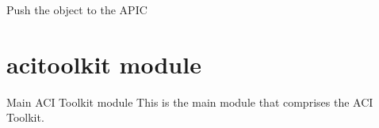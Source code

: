 \documentclass[letterpaper,10pt,english]{sphinxmanual}
\begin{document}
\begin{fulllineitems}
\begin{fulllineitems}
\begin{quote}
\begin{description}
\end{description}\end{quote}

\end{fulllineitems}


\begin{fulllineitems}
\label{acisession:acisession.Session.push_to_apic}
Push the object to the APIC

\end{fulllineitems}


\end{fulllineitems}



\section{acitoolkit module}
\label{acitoolkit::doc}\label{acitoolkit:module-acitoolkit}\label{acitoolkit:acitoolkit-module}
Main ACI Toolkit module
This is the main module that comprises the ACI Toolkit.
\end{document}
